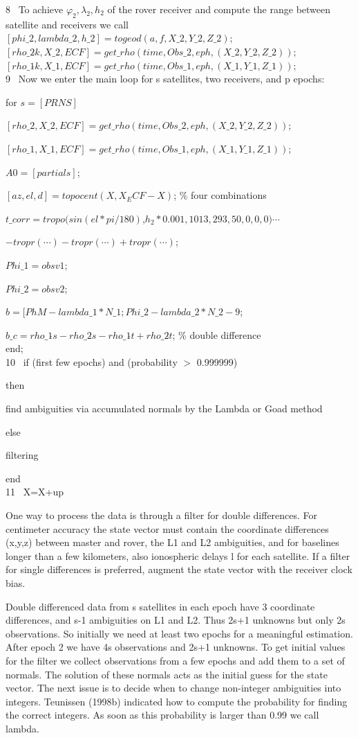 8\,\,\,\,\,To achieve $\varphi_{2},\lambda_{2},h_{2}$ of the rover receiver and compute the range between satellite and receivers we call\\
$[phi\_2,lambda\_2,h\_2]=togeod(a,f,X\_2,Y\_2,Z\_2);$\\
$[rho\_2\hat{ }k,X\_2,ECF]=get\_rho(time,Obs\_2,eph,(X\_2,Y\_2,Z\_2));$\\
$[rho\_1\hat{ }k,X\_1,ECF]=get\_rho(time,Obs\_1,eph,(X\_1,Y\_1,Z\_1));$\\
9\,\,\,\,\,Now we enter the main loop for s satellites, two receivers, and p epochs:

for $s = [PRNS]$

$[rho\_2,X\_2,ECF] = get\_rho(time,Obs\_2,eph,(X\_2,Y\_2,Z\_2))$;

$[rho\_1,X\_1,ECF] = get\_rho(time,Obs\_1,eph,(X\_1,Y\_1,Z\_1))$;

$A0 = [partials]$;

$[az,el,d]= topocent(X,X_ECF-X)$; \% four combinations

$t\_corr = tropo(sin(el * pi/180)$,$h_2 * 0.001,1013,293,50,0,0,0)\cdots $

$-tropr(\cdots)-tropr(\cdots) + tropr(\cdots)$;

$Phi\_1 = obsv1$;

$Phi\_2 = obsv2$;

$b = [PhM-lambda\_1 * N\_1; Phi\_2-lambda\_2 * N\_2-9$;

$b\_c = rho\_1\hat{ }s-rho\_2\hat{ }s-rho\_1\hat{ }t + rho\_2\hat{ }t$; \% double difference\\
end;\\
10\,\,\,\,\,if (first few epochs) and (probability $>$ 0.999999)

then

find ambiguities via accumulated normals by the Lambda or Goad method

else

filtering

end\\
11\,\,\,\,\,X=X+up

One way to process the data is through a filter for double differences. For centimeter accuracy the state vector must contain the coordinate differences (x,y,z) between master and rover, the L1 and L2 ambiguities, and for baselines longer than a few kilometers, also ionospheric delays l for each satellite. If a filter for single differences is preferred, augment the state vector with the receiver clock bias.

Double differenced data from s satellites in each epoch have 3 coordinate differences, and s-1 ambiguities on L1 and L2. Thus 2s+1 unknowns but only 2s observations. So initially we need at least two epochs for a meaningful estimation. After epoch 2 we have 4s observations and 2s+1 unknowns. To get initial values for the filter we collect observations from a few epochs and add them to a set of normals. The solution of these normals acts as the initial guess for the state vector. The next issue is to decide when to change non-integer ambiguities into integers. Teunissen (1998b) indicated how to compute the probability for finding the correct integers. As soon as this probability is larger than 0.99 we call lambda.

